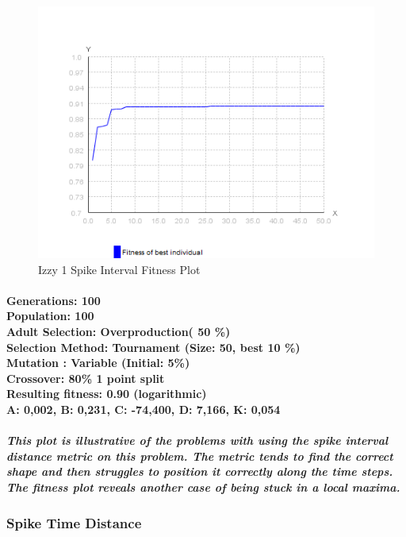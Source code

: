 \documentclass[titlepage,norsk]{article}
\begin{document}
\begin{figure}[h!]
\centering
\includegraphics[scale=0.75]{izzy1intervalFitness.png}
\caption{Izzy 1 Spike Interval Fitness Plot}
\label{fig:awesome_image}
\end{figure}

\paragraph{
Generations: 100\\
Population: 100\\
Adult Selection: Overproduction( 50 \%)\\
Selection Method: Tournament (Size: 50, best 10 \%) \\
Mutation : Variable (Initial: 5\%)\\
Crossover: 80\% 1 point split \\
Resulting fitness: 0.90 (logarithmic) \\
 A: 0,002, B: 0,231, C: -74,400, D: 7,166, K: 0,054 \\
}

\subparagraph{This plot is illustrative of the problems with using the spike interval distance metric on this problem. The metric  tends to find the correct shape and then struggles to position it correctly along the time steps. The fitness plot reveals another case of being stuck in a local maxima.}

\subsubsection{Spike Time  Distance}
\end{document}
